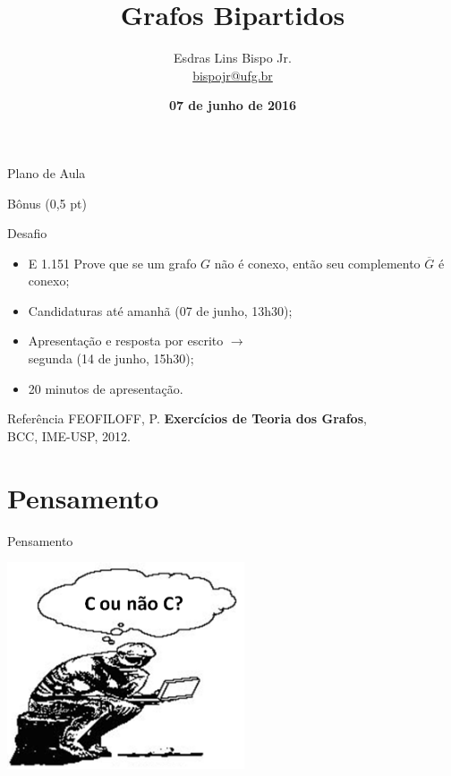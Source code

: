 \documentclass[xcolor=dvipsnames,table]{beamer}
\title{Grafos Bipartidos}
\author{
  Esdras Lins Bispo Jr. \\ \url{bispojr@ufg.br}
  }
\institute{
  Teoria de Grafos \\Bacharelado em Ciência da Computação}
\date{\textbf{07 de junho de 2016} }
\begin{document}
	\begin{frame}
		\titlepage
	\end{frame}

	\AtBeginSection{
		\begin{frame}{Sumário}%
    		\tableofcontents[currentsection]
		\end{frame}
	}

	\begin{frame}{Plano de Aula}
		\tableofcontents
	\end{frame}
	
	\begin{frame}{Bônus (0,5 pt)}
		\begin{block}{Desafio}
			\begin{itemize}
				\item {E 1.151} Prove que se um grafo $G$ não é conexo, então seu complemento $\overline{G}$ é conexo; 
                \item Candidaturas até amanhã (07 de junho, 13h30); 
                \item Apresentação e resposta por escrito $\rightarrow$ \\segunda (14 de junho, 15h30); 
                \item 20 minutos de apresentação.
			\end{itemize}
		\end{block}
        \begin{block}{Referência}
			FEOFILOFF, P. {\bf Exercícios de Teoria dos Grafos}, \\
			BCC, IME-USP, 2012. 
		\end{block}	
	\end{frame}
	
	\section{Pensamento}
	\begin{frame}{Pensamento}
  		\begin{center}
    		\includegraphics[width=7cm]{images/pensamento.png}
  		\end{center}
	\end{frame}
	
\end{document}
